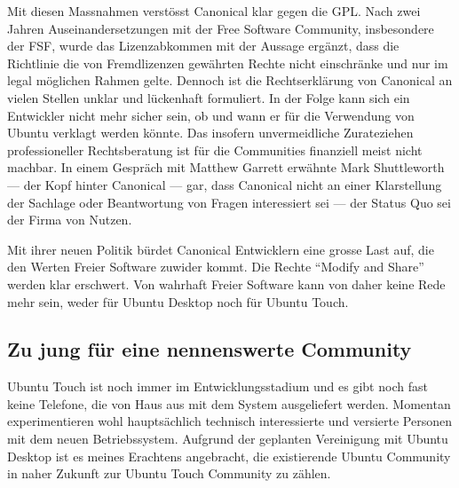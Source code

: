 Mit diesen Massnahmen verstösst Canonical klar gegen die GPL\thinspace\cite{online:ubuntutouch-fsf}. Nach zwei Jahren Auseinandersetzungen mit der Free Software Community, insbesondere der FSF, wurde das Lizenzabkommen mit der Aussage ergänzt, dass die Richtlinie die von Fremdlizenzen gewährten Rechte nicht einschränke und nur im legal möglichen Rahmen gelte\thinspace\cite{online:ubuntutouch-ip}. Dennoch ist die Rechtserklärung von Canonical an vielen Stellen unklar und lückenhaft formuliert\thinspace\cite{online:ubuntutouch-uncertain}. In der Folge kann sich ein Entwickler nicht mehr sicher sein, ob und wann er für die Verwendung von Ubuntu verklagt werden könnte. Das insofern unvermeidliche Zurateziehen professioneller Rechtsberatung ist für die Communities finanziell meist nicht machbar\thinspace\cite{online:ubuntutouch-mjgLicense}. In einem Gespräch mit Matthew Garrett\thinspace\cite{online:ubuntutouch-mjgConversation} erwähnte Mark Shuttleworth --- der Kopf hinter Canonical --- gar, dass Canonical nicht an einer Klarstellung der Sachlage oder Beantwortung von Fragen interessiert sei --- der Status Quo sei der Firma von Nutzen.

Mit ihrer neuen Politik bürdet Canonical Entwicklern eine grosse Last auf, die den Werten Freier Software zuwider kommt. Die Rechte ``Modify and Share'' werden klar erschwert\thinspace\cite{online:ubuntutouch-mjgLicense}. Von wahrhaft Freier Software kann von daher keine Rede mehr sein, weder für Ubuntu Desktop noch für Ubuntu Touch.
\newline

\subsection{Zu jung für eine nennenswerte Community}
Ubuntu Touch ist noch immer im Entwicklungsstadium und es gibt noch fast keine Telefone, die von Haus aus mit dem System ausgeliefert werden\thinspace\cite{online:ubuntutouch-wikipedia}. Momentan experimentieren wohl hauptsächlich technisch interessierte und versierte Personen mit dem neuen Betriebssystem. Aufgrund der geplanten Vereinigung mit Ubuntu Desktop ist es meines Erachtens angebracht, die existierende Ubuntu Community in naher Zukunft zur Ubuntu Touch Community zu zählen.
